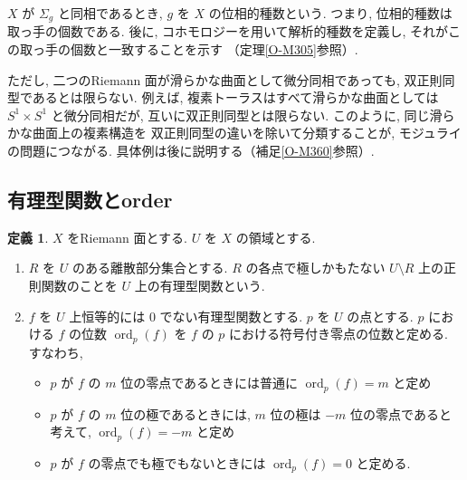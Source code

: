 \documentclass[dvipdfmx,a4paper,11pt]{article} %
\theoremstyle{definition}
\numberwithin{equation}{section}
\newtheorem{dfn}[thm]{定義}
\begin{document}
$X$ が $\Sigma_g$ と同相であるとき,
$g$ を $X$ の位相的種数という. つまり, 位相的種数は取っ手の個数である.
後に, コホモロジーを用いて解析的種数を定義し,
それがこの取っ手の個数と一致することを示す
（定理\ref{O-M305}参照）.

ただし, 二つのRiemann 面が滑らかな曲面として微分同相であっても,
双正則同型であるとは限らない.
例えば, 複素トーラスはすべて滑らかな曲面としては
$S^1\times S^1$ と微分同相だが,
互いに双正則同型とは限らない.
このように, 同じ滑らかな曲面上の複素構造を
双正則同型の違いを除いて分類することが,
モジュライの問題につながる.
具体例は後に説明する（補足\ref{O-M360}参照）.


\subsection{有理型関数とorder}\label{O-S015}


\begin{dfn}\label{O-M056}
$X$ をRiemann 面とする. $U$ を $X$ の領域とする.
\begin{enumerate}
\item
$R$ を $U$ のある離散部分集合とする. $R$ の各点で極しかもたない $U\setminus R$ 上の正則関数のことを $U$ 上の有理型関数という.
\item
$f$ を $U$ 上恒等的には $0$ でない有理型関数とする. $p$ を $U$ の点とする. $p$ における $f$ の位数 $\operatorname{ord}_p(f)$ を $f$ の $p$ における符号付き零点の位数と定める. 
すなわち,
\begin{itemize}
\item $p$ が $f$ の $m$ 位の零点であるときには普通に $\operatorname{ord}_p(f)=m$ と定め
\item $p$ が $f$ の $m$ 位の極であるときには, $m$ 位の極は $-m$ 位の零点であると考えて, $\operatorname{ord}_p(f)=-m$ と定め
\item  $p$ が $f$ の零点でも極でもないときには $\operatorname{ord}_p(f)=0$ と定める.
\end{itemize}

\end{enumerate}
\end{dfn}
\end{document}

